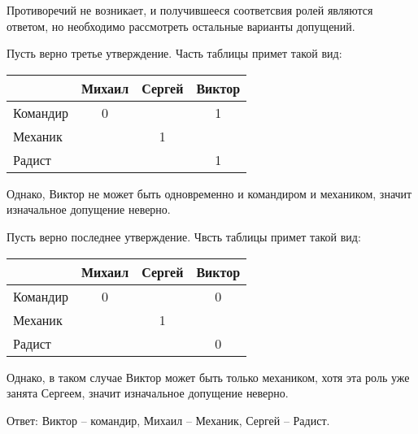 \rule{0cm}{0.3cm}

Противоречий не возникает, и получившееся соответсвия ролей являются ответом, 
но необходимо рассмотреть остальные варианты допущений.

Пусть верно третье утверждение. Часть таблицы примет такой вид:

\rule{0cm}{0.3cm}

\begin{tabular}{|l|c|c|c|}
  \hline
           & Михаил & Сергей & Виктор \\ \hline
  Командир & 0      &        & 1      \\ \hline
  Механик  &        & 1      &        \\ \hline
  Радист   &        &        & 1      \\ \hline
\end{tabular}

\rule{0cm}{0.3cm}

Однако, Виктор не может быть одновременно и командиром и механиком, значит 
изначальное допущение неверно.

Пусть верно последнее утверждение. Чвсть таблицы примет такой вид:

\rule{0cm}{0.3cm}

\begin{tabular}{|l|c|c|c|}
  \hline
           & Михаил & Сергей & Виктор \\ \hline
  Командир & 0      &        & 0      \\ \hline
  Механик  &        & 1      &        \\ \hline
  Радист   &        &        & 0      \\ \hline
\end{tabular}

\rule{0cm}{0.3cm}

Однако, в таком случае Виктор может быть только механиком,
хотя эта роль уже занята Сергеем, значит изначальное допущение неверно.

\rule{0cm}{0.3cm}

Ответ: Виктор -- командир, Михаил -- Механик, Сергей -- Радист.
